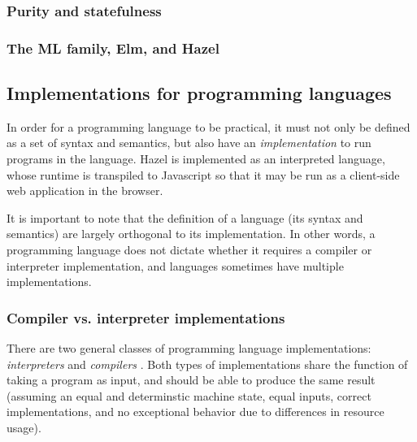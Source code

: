 




\subsubsection{Purity and statefulness}
\label{sec:purity}

\subsubsection{The ML family, Elm, and Hazel}
\label{sec:ml-fam}


\subsection{Implementations for programming languages}
\label{sec:interpreters}

In order for a programming language to be practical, it must not only be defined as a set of syntax and semantics, but also have an \textit{implementation} to run programs in the language. Hazel is implemented as an interpreted language, whose runtime is transpiled to Javascript so that it may be run as a client-side web application in the browser.

It is important to note that the definition of a language (its syntax and semantics) are largely orthogonal to its implementation. In other words, a programming language does not dictate whether it requires a compiler or interpreter implementation, and languages sometimes have multiple implementations.

\subsubsection{Compiler vs. interpreter implementations}
\label{sec:comp-vs-interp}

There are two general classes of programming language implementations: \textit{interpreters} and \textit{compilers} \cite{aho86}. Both types of implementations share the function of taking a program as input, and should be able to produce the same result (assuming an equal and determinstic machine state, equal inputs, correct implementations, and no exceptional behavior due to differences in resource usage).

